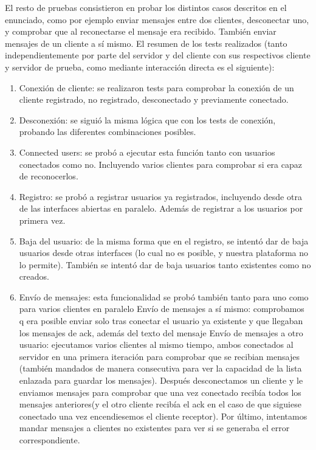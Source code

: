 El resto de pruebas consistieron en probar los distintos casos descritos en el enunciado, como por ejemplo enviar mensajes entre dos clientes, desconectar uno, y comprobar que al reconectarse el mensaje era recibido. También enviar mensajes de un cliente a sí mismo. El resumen de los tests realizados (tanto independientemente por parte del servidor y del cliente con sus respectivos cliente y servidor de prueba, como mediante interacción directa es el siguiente):
\begin{enumerate}
    \item Conexión de cliente: se realizaron tests para comprobar la conexión de un cliente registrado, no registrado, desconectado y previamente conectado.
    \item Desconexión: se siguió la misma lógica que con los tests de conexión, probando las diferentes combinaciones posibles.
    \item Connected users: se probó a ejecutar esta función tanto con usuarios conectados como no. Incluyendo varios clientes para comprobar si era capaz de reconocerlos.
    \item Registro: se probó a registrar usuarios ya registrados, incluyendo desde otra de las interfaces abiertas en paralelo. Además de registrar a los usuarios por primera vez.
    \item Baja del usuario: de la misma forma que en el registro, se intentó dar de baja usuarios desde otras interfaces (lo cual no es posible, y nuestra plataforma no lo permite). También se intentó dar de baja usuarios tanto existentes como no creados.
    \item Envío de mensajes: esta funcionalidad se probó también tanto para uno como para varios clientes en paralelo
    \subitem Envío de mensajes a sí mismo: comprobamos q era posible enviar solo tras conectar el usuario ya existente y que llegaban los mensajes de ack, además del texto del mensaje
    \subitem Envío de mensajes a otro usuario: ejecutamos varios clientes al mismo tiempo, ambos conectados al servidor en una primera iteración para comprobar que se recibian mensajes (también mandados de manera consecutiva para ver la capacidad de la lista enlazada para guardar los mensajes). Después desconectamos un cliente y le enviamos mensajes para comprobar que una vez conectado recibía todos los mensajes anteriores(y el otro cliente recibía el ack en el caso de que siguiese conectado una vez encendiesemos el cliente receptor). Por último, intentamos mandar mensajes a clientes no existentes para ver si se generaba el error correspondiente.

\end{enumerate}